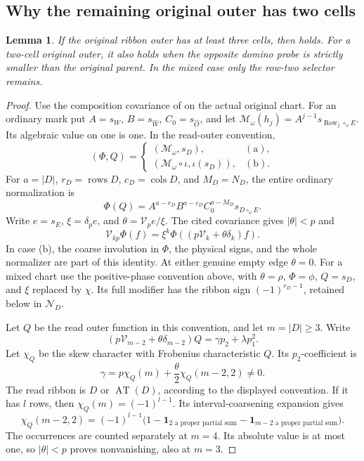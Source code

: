 \documentclass[11pt,a4paper]{amsart}
\numberwithin{equation}{section}
\theoremstyle{plain}
\newtheorem{lemma}[theorem]{Lemma}
\theoremstyle{definition}
\newcommand{\one}{\mathbf1}
\newcommand{\AT}{\operatorname{AT}}
\newcommand{\Row}{\operatorname{Row}}
\newcommand{\Vop}{\mathcal V}
\newcommand{\ii}{\iota}
\begin{document}
\subsection{Why the remaining original outer has two cells}
\begin{lemma}\label{rt:domino-probe}
If the original ribbon outer has at least three cells, then  holds.  For a two-cell original outer, it also holds when the opposite domino probe is strictly smaller than the original parent.  In the mixed case only the row-two selector remains.
\end{lemma}
\begin{proof}
Use the composition covariance of \cite{Shields2026Readout} on the actual original chart.  For an ordinary mark put
\(A=s_W\), \(B=s_{\widehat W}\), \(C_0=s_{\widehat O}\), and let
\(\mathcal M_\omega(h_j)=A^{j-1}s_{\Row_j\circ_\omega E}\).
Its algebraic value on one is one.  In the read-outer convention,
\[
 (\Phi,Q)=
 \begin{cases}
  (\mathcal M_\omega,s_D),&\mathrm{(a)},\\
  (\mathcal M_\omega\circ\ii,\ii(s_D)),&\mathrm{(b)}.
 \end{cases}
\]
For \(a=|D|\), \(r_D=\operatorname{rows}D\), \(c_D=\operatorname{cols}D\), and \(M_D=N_D\), the entire ordinary normalization is
\[
 \Phi(Q)=A^{a-r_D}B^{a-c_D}C_0^{a-M_D}s_{D\circ_\omega E}.
\]
Write \(e=s_E\), \(\xi=\delta_p e\), and \(\theta=\Vop_pe/\xi\).  The cited covariance gives \(|\theta|<p\) and
\[
 \Vop_{kp}\Phi(f)=\xi^k\Phi((p\Vop_k+\theta\delta_k)f).
\]
In case (b), the coarse involution in \(\Phi\), the physical signs, and the whole normalizer are part of this identity.  At either genuine empty edge \(\theta=0\).  For a mixed chart use the positive-phase convention above, with \(\theta=\rho\), \(\Phi=\phi\), \(Q=s_D\), and \(\xi\) replaced by \(\chi\).  Its full modifier has the ribbon sign \((-1)^{r_D-1}\), retained below in \(\mathcal N_D\).

Let \(Q\) be the read outer function in this convention, and let \(m=|D|\ge3\).  Write
\[
 (p\Vop_{m-2}+\theta\delta_{m-2})Q=\gamma p_2+\lambda p_1^2.
\]
Let \(\chi_Q\) be the skew character with Frobenius characteristic
\(Q\).  Its \(p_2\)-coefficient is
\[
 \gamma=p\chi_Q(m)+\frac{\theta}{2}\chi_Q(m-2,2)\ne0.
\]
The read ribbon is \(D\) or \(\AT(D)\), according to the displayed
convention.  If it has \(l\) rows, then \(\chi_Q(m)=(-1)^{l-1}\).
Its interval-coarsening expansion gives
\[
 \chi_Q(m-2,2)=(-1)^{l-1}
 \bigl(1-\one_{2\text{ a proper partial sum}}
          -\one_{m-2\text{ a proper partial sum}}\bigr).
\]
The occurrences are counted separately at \(m=4\).  Its absolute value is at most one, so \(|\theta|<p\) proves nonvanishing, also at \(m=3\).


\end{proof}
\end{document}
